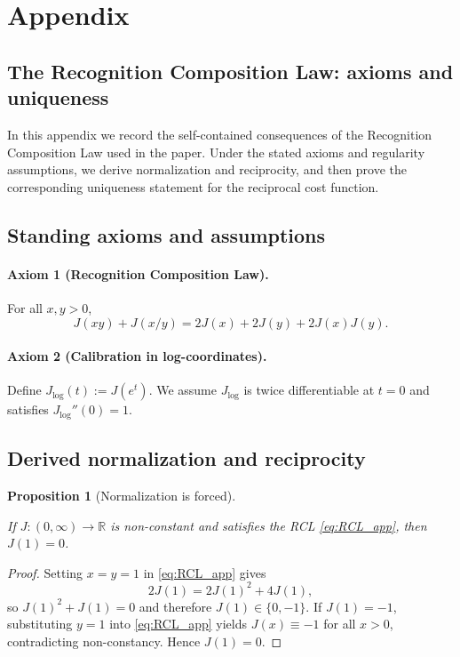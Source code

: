 \documentclass[11pt,reqno]{amsart}
\newtheorem{proposition}[theorem]{Proposition}
\theoremstyle{definition}
\theoremstyle{remark}
\newcommand{\R}{\mathbb{R}}
\newcommand{\1}{\mathbf{1}}
\begin{document}
\section*{Appendix}
\setcounter{subsection}{0}
\subsection*{The Recognition Composition Law: axioms and uniqueness}

In this appendix we record the self-contained consequences of the Recognition Composition Law used in the paper. Under the stated axioms and regularity assumptions, we derive normalization and reciprocity, and then prove the corresponding uniqueness statement for the reciprocal cost function.

\subsection{Standing axioms and assumptions}\label{app:RCL:axioms}


\paragraph{Axiom 1 (Recognition Composition Law).} For all $x,y>0$,
\begin{equation}\tag{RCL}\label{eq:RCL_app}
J(xy)+J(x/y)=2J(x)+2J(y)+2J(x)J(y).
\end{equation}

\paragraph{Axiom 2 (Calibration in log-coordinates).} Define $J_{\log}(t):=J(e^{t})$. We assume $J_{\log}$ is twice differentiable at $t=0$ and satisfies $J_{\log}''(0)=1$.


\subsection{Derived normalization and reciprocity}

\begin{proposition}[Normalization is forced]\label{prop:norm-forced-vv}

If $J:(0,\infty)\to\R$ is non-constant and satisfies the RCL \eqref{eq:RCL_app}, then $J(1)=0$.

\end{proposition}

\begin{proof}

Setting $x=y=1$ in \eqref{eq:RCL_app} gives
\[
2J(1)=2J(1)^2+4J(1),
\]
so $J(1)^2+J(1)=0$ and therefore $J(1)\in\{0,-1\}$.
If $J(1)=-1$, substituting $y=1$ into \eqref{eq:RCL_app} yields $J(x)\equiv -1$ for all $x>0$, contradicting non-constancy.
Hence $J(1)=0$.

\end{proof}
\end{document}
